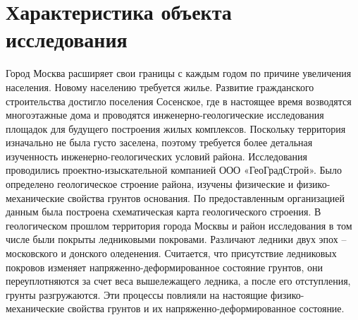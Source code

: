 \chapter{Характеристика объекта исследования}

Город Москва расширяет свои границы с каждым годом по причине увеличения населения. Новому населению требуется жилье. Развитие гражданского строительства достигло поселения Сосенское, где в настоящее время возводятся многоэтажные дома и проводятся инженерно-геологические исследования площадок для будущего построения жилых комплексов.
Поскольку территория изначально не была густо заселена, поэтому требуется более детальная изученность инженерно-геологических условий района. 
Исследования проводились проектно-изыскательной компанией ООО «ГеоГрадСтрой». Было определено геологическое строение района, изучены физические и физико-механические свойства грунтов основания. По предоставленным организацией данным была построена схематическая карта геологического строения.
В геологическом прошлом территория города Москвы и район исследования в том числе были покрыты ледниковыми покровами. Различают ледники двух эпох – московского и донского оледенения. Считается, что присутствие ледниковых покровов изменяет напряженно-деформированное состояние грунтов, они переуплотняются за счет веса вышележащего ледника, а после его отступления, грунты разгружаются. Эти процессы повлияли на настоящие физико-механические свойства грунтов и их напряженно-деформированное состояние.

